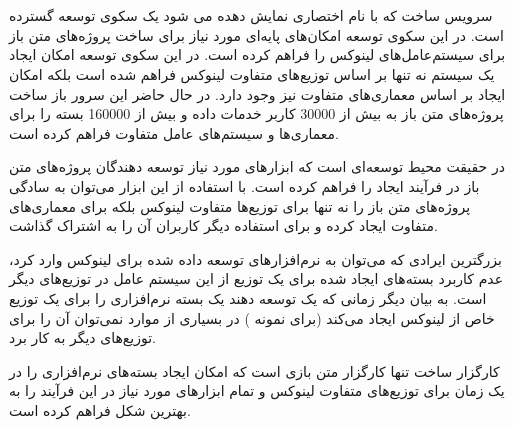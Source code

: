 %
% 
% 
% 
%

\section{}

سرویس ساخت  که با نام اختصاری
 نمایش دهده می شود یک سکوی توسعه گسترده است. در این سکوی توسعه امکان‌های پایه‌ای مورد
نیاز برای ساخت پروژه‌های متن باز برای سیستم‌عامل‌های لینوکس را فراهم کرده است.
در این سکوی توسعه امکان ایجاد یک سیستم نه تنها بر اساس توزیع‌های متفاوت لینوکس
فراهم شده است بلکه امکان ایجاد بر اساس معماری‌های متفاوت نیز وجود دارد. در حال
حاضر این سرور باز ساخت پروژه‌های متن باز به بیش از 30000 کاربر خدمات داده و بیش
از 160000 بسته را برای معماری‌ها و سیستم‌های عامل متفاوت فراهم کرده
است\cite{buildopensuse}.


 در حقیقت محیط توسعه‌ای است که ابزارهای مورد نیاز توسعه دهندگان
پروژه‌های متن باز در فرآیند ایجاد را فراهم کرده است. با استفاده از این ابزار
می‌توان به سادگی پروژه‌های متن باز را نه تنها برای توزیع‌ها متفاوت لینوکس بلکه
برای معماری‌های متفاوت ایجاد کرده و برای استفاده دیگر کاربران آن را به اشتراک
گذاشت.

بزرگترین ایرادی که می‌توان به نرم‌افزارهای توسعه داده شده برای لینوکس وارد کرد،
عدم کاربرد بسته‌های ایجاد شده برای یک توزیع از این سیستم عامل در توزیع‌های دیگر
است. به بیان دیگر زمانی که یک توسعه دهند یک بسته نرم‌افزاری را برای یک توزیع خاص
از لینوکس ایجاد می‌کند (برای نمونه ) در بسیاری از موارد نمی‌توان آن
را برای توزیع‌های دیگر به کار برد.

کارگزار ساخت  تنها کارگزار متن بازی است که امکان ایجاد بسته‌های
نرم‌افزاری را در یک زمان برای توزیع‌های متفاوت لینوکس و تمام
ابزارهای مورد نیاز در این فرآیند را به بهترین شکل  فراهم کرده است.

